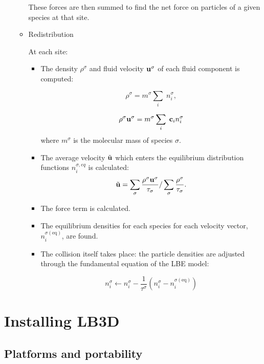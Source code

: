 \documentclass[a4paper]{article}
\begin{document}
\begin{itemize}
\begin{itemize}
		These forces are then summed to find the net force on
		particles of a given species at that site.

	\item{Redistribution}

	At each site:

	\begin{itemize}
	\item
		The density $\rho^{\sigma}$ and fluid velocity 
                ${\bf u}^{\sigma}$ of each fluid component is computed:

	        \[
	    \rho^{\sigma}= m^{\sigma}\sum_i \; n_i^{\sigma},
                \]

	\[ 
	\rho^{\sigma} {\bf u}^\sigma = m^{\sigma}\sum_i \; {\bf c}_i n_i^{\sigma} 
	\]
	where $m^{\sigma}$ is the molecular mass of species $\sigma$.

	\item
		The average velocity $\tilde{ {\bf u }}$ 
                which enters the equilibrium 
                distribution functions $n_i^{\sigma,eq}$ is calculated:
 		\[
		{\tilde {\bf u}} 
		= 
		\sum_\sigma \frac {\rho^\sigma {\bf
		u}^\sigma}{\tau_\sigma} 
		/ 
		\sum_\sigma \frac {\rho^\sigma} {\tau_\sigma}.
		\]
	\item
		The force term is calculated. 

		
	\item
		The equilibrium densities for each species for each
		velocity vector, $n^{\sigma\mathrm{(eq)}}_i$, are found.
	\item
		The collision itself takes place: the particle densities
		are adjusted through the fundamental equation of the LBE
		model:

		\[
			n^{\sigma}_i \leftarrow
					n^{\sigma}_i -
					\frac 1 {\tau^{\sigma}}
					\left(
						n^{\sigma}_i -
						n^{\sigma\mathrm{(eq)}}_i
					\right)
		\]

		

	\end{itemize}
	\end{itemize}

\end{itemize}


\section{Installing LB3D}

\subsection{Platforms and portability}
\end{document}
